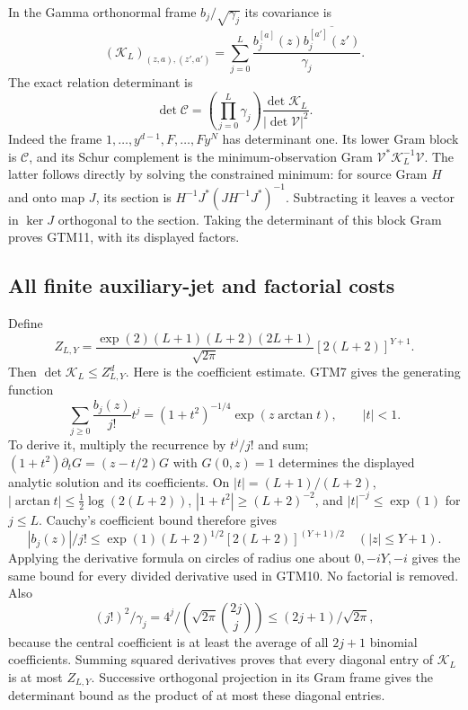 In the Gamma orthonormal frame $b_j/\sqrt{\gamma_j}$ its covariance is
\begin{equation}\tag{GTM10}
 (\mathcal K_L)_{(z,a),(z',a')}
  =\sum_{j=0}^L\frac{b_j^{[a]}(z)
                    \overline{b_j^{[a']}(z')}}{\gamma_j}.
\end{equation}
The exact relation determinant is
\begin{equation}\tag{GTM11}
 \det\mathcal C=
  \left(\prod_{j=0}^L\gamma_j\right)
          \frac{\det\mathcal K_L}{|\det\mathcal V|^2}.
\end{equation}
Indeed the frame $1,\ldots,y^{d-1},F,\ldots,Fy^N$ has determinant
one.  Its lower Gram block is $\mathcal C$, and its Schur complement
is the minimum-observation Gram
$\mathcal V^*\mathcal K_L^{-1}\mathcal V$.
The latter follows directly by solving the constrained minimum:
for source Gram $H$ and onto map $J$, its section is
$H^{-1}J^*(JH^{-1}J^*)^{-1}$.  Subtracting it leaves a vector in
$\ker J$ orthogonal to the section.  Taking the determinant of this
block Gram proves GTM11, with its displayed factors.

\subsection{All finite auxiliary-jet and factorial costs}

Define
\begin{equation}\tag{GTM12}
 Z_{L,Y}=\frac{\exp(2)(L+1)(L+2)(2L+1)}{\sqrt{2\pi}}
                 [2(L+2)]^{Y+1}.
\end{equation}
Then $\det\mathcal K_L\le Z_{L,Y}^{d}$.
Here is the coefficient estimate.  GTM7 gives the generating function
\[
 \sum_{j\ge0}\frac{b_j(z)}{j!}t^j
 =(1+t^2)^{-1/4}\exp(z\arctan t),\qquad |t|<1.
\]
To derive it, multiply the recurrence by $t^j/j!$ and sum;
$(1+t^2)\partial_t G=(z-t/2)G$ with $G(0,z)=1$ determines the
displayed analytic solution and its coefficients.
On $|t|=(L+1)/(L+2)$,
$|\arctan t|\le\tfrac12\log(2(L+2))$,
$|1+t^2|\ge(L+2)^{-2}$, and $|t|^{-j}\le\exp(1)$ for $j\le L$.
Cauchy's coefficient bound therefore gives
\[
 |b_j(z)|/j!\le\exp(1)(L+2)^{1/2}[2(L+2)]^{(Y+1)/2}
                       \quad(|z|\le Y+1).
\]
Applying the derivative formula on circles of radius one about
$0,-iY,-i$ gives the same bound for every divided derivative used
in GTM10.  No factorial is removed.  Also
\[
 (j!)^2/\gamma_j
 =4^j/(\sqrt{2\pi}\binom{2j}{j})\le(2j+1)/\sqrt{2\pi},
\]
because the central coefficient is at least the average of all
$2j+1$ binomial coefficients.  Summing squared derivatives proves
that every diagonal entry of $\mathcal K_L$ is at most $Z_{L,Y}$.
Successive orthogonal projection in its Gram frame gives the
determinant bound as the product of at most these diagonal entries.

